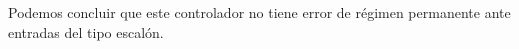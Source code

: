 \documentclass{article}
\begin{document}
Podemos concluir que este  controlador no tiene error de régimen permanente ante entradas del tipo escalón.
\end{document}
